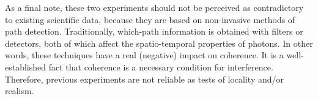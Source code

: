 \documentclass[a4paper,aps,prl,twocolumn,showpacs]{revtex4}
\begin{document}
As a final note, these two experiments should not be perceived as
contradictory to existing scientific data, because they are based
on non-invasive methods of path detection. Traditionally,
which-path information is obtained with filters or detectors, both
of which affect the spatio-temporal properties of photons. In
other words, these techniques have a real (negative) impact on
coherence. It is a well-established fact that coherence is a
necessary condition for interference. Therefore, previous
experiments are not reliable as tests of locality and/or realism.




%
\end{document}
